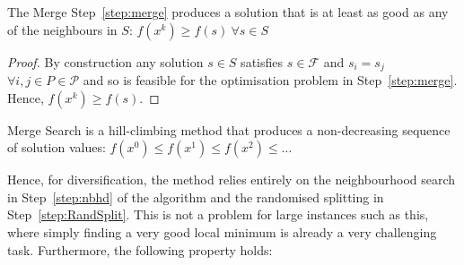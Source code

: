 \documentclass[preprint]{elsarticle}
\begin{document}
\begin{lemma}\label{thm:improve}
  The Merge Step~\ref{step:merge} produces a solution that is at least as good
  as any of the neighbours in $S$: $f(x^k) \ge f(s)\ \forall s\in S$
\end{lemma}
\begin{proof}
  By construction any solution $s\in S$ satisfies $s\in \mathcal{F}$ and
  $s_i=s_j$ $\forall i,j\in P\in\mathcal{P}$ and so is feasible for the
  optimisation problem in Step~\ref{step:merge}. Hence, $f(x^k)\ge f(s)$.
\end{proof}

\begin{corollary}\label{thm:hill-climb}
  Merge Search is a hill-climbing method that produces a non-decreasing sequence
 of solution values: $f(x^0)\le f(x^1)\le f(x^2)\le \ldots$
\end{corollary}

Hence, for diversification, the method relies entirely on the neighbourhood
search in Step~\ref{step:nbhd} of the algorithm and the randomised splitting in
Step~\ref{step:RandSplit}. This is not a problem for large instances such as
this, where simply finding a very good local minimum is already a very
challenging task. Furthermore, the following property holds:
\end{document}
